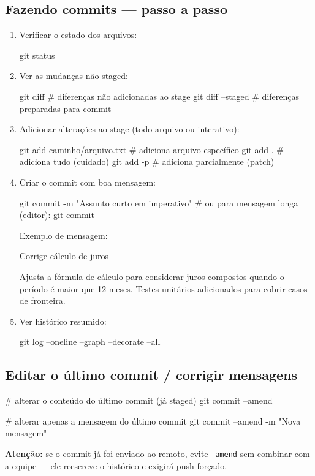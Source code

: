 \subsection{Fazendo commits — passo a passo}
\begin{enumerate}
  \item Verificar o estado dos arquivos:
  \begin{bashcode}
  git status
  \end{bashcode}
  \item Ver as mudanças não staged:
  \begin{bashcode}
  git diff       # diferenças não adicionadas ao stage
  git diff --staged  # diferenças preparadas para commit
  \end{bashcode}
  \item Adicionar alterações ao stage (todo arquivo ou interativo):
  \begin{bashcode}
  git add caminho/arquivo.txt  # adiciona arquivo específico
  git add .                    # adiciona tudo (cuidado)
  git add -p                   # adiciona parcialmente (patch)
  \end{bashcode}
  \item Criar o commit com boa mensagem:
  \begin{bashcode}
  git commit -m "Assunto curto em imperativo"
  # ou para mensagem longa (editor):
  git commit
  \end{bashcode}
  Exemplo de mensagem:
  \begin{bashcode}
  Corrige cálculo de juros

  Ajusta a fórmula de cálculo para considerar juros compostos
  quando o período é maior que 12 meses. Testes unitários
  adicionados para cobrir casos de fronteira.
  \end{bashcode}
  \item Ver histórico resumido:
  \begin{bashcode}
  git log --oneline --graph --decorate --all
  \end{bashcode}
\end{enumerate}

\subsection{Editar o último commit / corrigir mensagens}
\begin{bashcode}
# alterar o conteúdo do último commit (já staged)
git commit --amend

# alterar apenas a mensagem do último commit
git commit --amend -m "Nova mensagem"
\end{bashcode}
\textbf{Atenção:} se o commit já foi enviado ao remoto, evite \texttt{--amend} sem combinar com a equipe — ele reescreve o histórico e exigirá push forçado.

